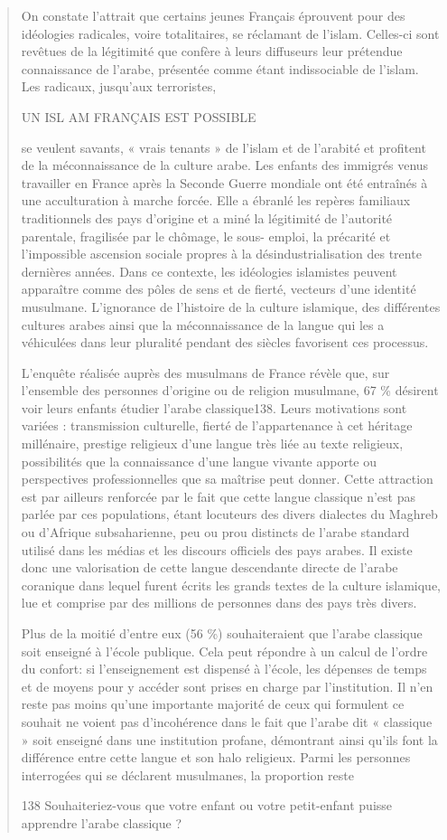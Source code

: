 \begin{quote}
On constate l'attrait que certains jeunes Français éprouvent pour des
idéologies radicales, voire totalitaires, se réclamant de l'islam.
Celles-ci sont revêtues de la légitimité que confère à leurs diffuseurs
leur prétendue connaissance de l'arabe, présentée comme étant
indissociable de l'islam. Les radicaux, jusqu'aux terroristes,

UN ISL AM FRANÇAIS EST POSSIBLE

se veulent savants, « vrais tenants » de l'islam et de l'arabité et
profitent de la méconnaissance de la culture arabe. Les enfants des
immigrés venus travailler en France après la Seconde Guerre mondiale ont
été entraînés à une acculturation à marche forcée. Elle a ébranlé les
repères familiaux traditionnels des pays d'origine et a miné la
légitimité de l'autorité parentale, fragilisée par le chômage, le sous-
emploi, la précarité et l'impossible ascension sociale propres à la
désindustrialisation des trente dernières années. Dans ce contexte, les
idéologies islamistes peuvent apparaître comme des pôles de sens et de
fierté, vecteurs d'une identité musulmane. L'ignorance de l'histoire de
la culture islamique, des différentes cultures arabes ainsi que la
méconnaissance de la langue qui les a véhiculées dans leur pluralité
pendant des siècles favorisent ces processus.

L'enquête réalisée auprès des musulmans de France révèle que, sur
l'ensemble des personnes d'origine ou de religion musulmane, 67 \%
désirent voir leurs enfants étudier l'arabe classique138. Leurs
motivations sont variées : transmission culturelle, fierté de
l'appartenance à cet héritage millénaire, prestige religieux d'une
langue très liée au texte religieux, possibilités que la connaissance
d'une langue vivante apporte ou perspectives professionnelles que sa
maîtrise peut donner. Cette attraction est par ailleurs renforcée par le
fait que cette langue classique n'est pas parlée par ces populations,
étant locuteurs des divers dialectes du Maghreb ou d'Afrique
subsaharienne, peu ou prou distincts de l'arabe standard utilisé dans
les médias et les discours officiels des pays arabes. Il existe donc une
valorisation de cette langue descendante directe de l'arabe coranique
dans lequel furent écrits les grands textes de la culture islamique, lue
et comprise par des millions de personnes dans des pays très divers.

Plus de la moitié d'entre eux (56 \%) souhaiteraient que l'arabe
classique soit enseigné à l'école publique. Cela peut répondre à un
calcul de l'ordre du confort: si l'enseignement est dispensé à l'école,
les dépenses de temps et de moyens pour y accéder sont prises en charge
par l'institution. Il n'en reste pas moins qu'une importante majorité de
ceux qui formulent ce souhait ne voient pas d'incohérence dans le fait
que l'arabe dit « classique » soit enseigné dans une institution
profane, démontrant ainsi qu'ils font la différence entre cette langue
et son halo religieux. Parmi les personnes interrogées qui se déclarent
musulmanes, la proportion reste

138 Souhaiteriez-vous que votre enfant ou votre petit-enfant puisse
apprendre l'arabe classique ?
\end{quote}

